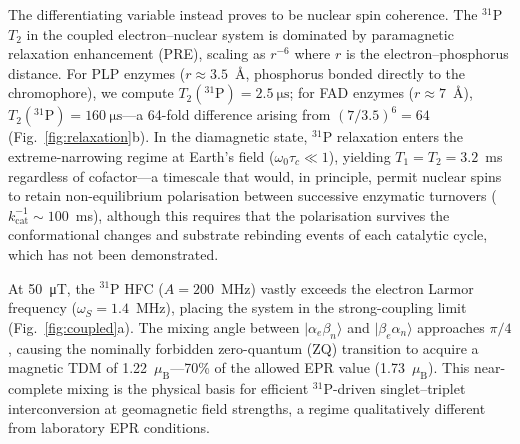 \documentclass[11pt]{article}
\begin{document}
The differentiating variable instead proves to be nuclear spin coherence. The $^{31}$P $T_2$ in the coupled electron--nuclear system is dominated by paramagnetic relaxation enhancement (PRE)\cite{Solomon1955}, scaling as $r^{-6}$ where $r$ is the electron--phosphorus distance. For PLP enzymes ($r \approx 3.5$~\AA, phosphorus bonded directly to the chromophore), we compute $T_2(^{31}\mathrm{P}) = 2.5~\si{\micro\second}$; for FAD enzymes ($r \approx 7$~\AA), $T_2(^{31}\mathrm{P}) = 160~\si{\micro\second}$---a 64-fold difference arising from $(7/3.5)^6 = 64$ (Fig.~\ref{fig:relaxation}b). In the diamagnetic state, $^{31}$P relaxation enters the extreme-narrowing regime at Earth's field ($\omega_0\tau_c \ll 1$), yielding $T_1 = T_2 = 3.2$~ms regardless of cofactor---a timescale that would, in principle, permit nuclear spins to retain non-equilibrium polarisation between successive enzymatic turnovers ($k_\mathrm{cat}^{-1} \sim 100$~ms), although this requires that the polarisation survives the conformational changes and substrate rebinding events of each catalytic cycle, which has not been demonstrated.

At 50~\si{\micro\tesla}, the $^{31}$P HFC ($A = 200$~MHz) vastly exceeds the electron Larmor frequency ($\omega_S = 1.4$~MHz), placing the system in the strong-coupling limit (Fig.~\ref{fig:coupled}a). The mixing angle between $|\alpha_e\beta_n\rangle$ and $|\beta_e\alpha_n\rangle$ approaches $\pi/4$, causing the nominally forbidden zero-quantum (ZQ) transition to acquire a magnetic TDM of 1.22~$\mu_\mathrm{B}$---70\% of the allowed EPR value (1.73~$\mu_\mathrm{B}$). This near-complete mixing is the physical basis for efficient $^{31}$P-driven singlet--triplet interconversion at geomagnetic field strengths, a regime qualitatively different from laboratory EPR conditions.
\end{document}
